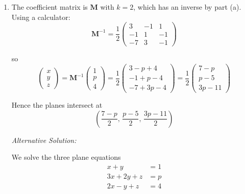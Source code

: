 \documentclass[leqno]{article}
\begin{document}
\begin{enumerate}[
  label=\textbf{\arabic*.},
  leftmargin=*,
  topsep=0pt,
  partopsep=0pt,
  parsep=0pt
]
\begin{djsSolution}
\begin{enumerate}[label=\textbf{(\alph*)}]
  expand along the first row:
  \begin{align*}
  \det(\mathbf{M})
  &=1\begin{vmatrix}k&1\\-1&1\end{vmatrix}
   -1\begin{vmatrix}3&1\\2&1\end{vmatrix}
   +0\begin{vmatrix}3&k\\2&-1\end{vmatrix} \\
  &=1(k\times 1-1\times(-1)) -1(3\times 1-1\times 2) +0 \\
  &=(k+1)-(3-2) \\
  &=k
  \end{align*}

  Therefore $\mathbf{M}$ has an inverse when
  \[
  k\neq 0
  \]

  \item The coefficient matrix is \(\mathbf{M}\) with \(k=2\), which has an inverse by part (a). Using a calculator:
  \[
  \mathbf{M}^{-1}=\frac12\begin{pmatrix}
  3 & -1 & 1\\
  -1 & 1 & -1\\
  -7 & 3 & -1
  \end{pmatrix}
  \]

  so
  \[
  \begin{pmatrix}x\\y\\z\end{pmatrix}
  =\mathbf{M}^{-1}\begin{pmatrix}1\\p\\4\end{pmatrix}
  =\frac12\begin{pmatrix}3-p+4\\-1+p-4\\-7+3p-4\end{pmatrix}
  =\frac12\begin{pmatrix}7-p\\p-5\\3p-11\end{pmatrix}
  \]

  Hence the planes intersect at
  \[
  \left(\frac{7-p}{2},\,\frac{p-5}{2},\,\frac{3p-11}{2}\right)
  \]

  \textit{Alternative Solution:}

  We solve the three plane equations
  \[
  \begin{aligned}
  x+y&=1 \\
  3x+2y+z&=p \\
  2x-y+z&=4
  \end{aligned}
  \]


\end{enumerate}
\end{djsSolution}
\end{enumerate}
\end{document}
